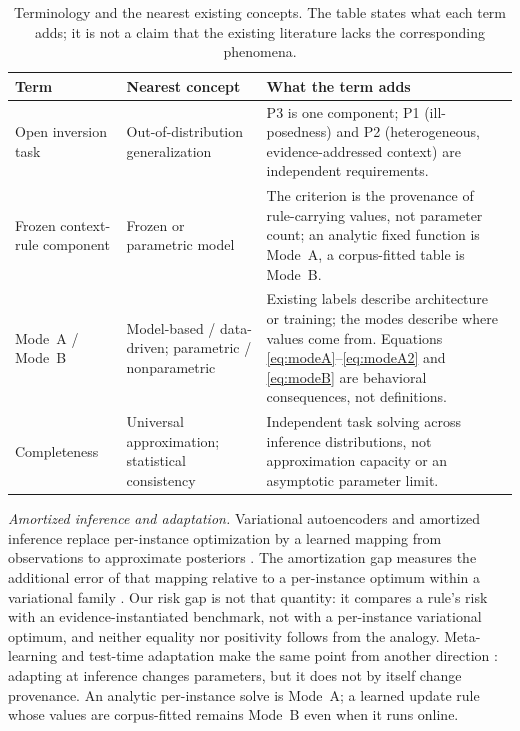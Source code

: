 \documentclass[twoside,11pt]{article}
\begin{document}
\begin{table}[!ht]
\caption{Terminology and the nearest existing concepts. The table states what each term adds; it is not a claim that the existing literature lacks the corresponding phenomena.}
\label{tab:terminology}
\centering
\small
\begin{tabular}{@{}>{\raggedright\arraybackslash}p{}>{\raggedright\arraybackslash}p{}>{\raggedright\arraybackslash}p{}@{}}
\hline
\textbf{Term} & \textbf{Nearest concept} & \textbf{What the term adds}\\
\hline
Open inversion task & Out-of-distribution generalization & P3 is one component; P1 (ill-posedness) and P2 (heterogeneous, evidence-addressed context) are independent requirements.\\
Frozen context-rule component & Frozen or parametric model & The criterion is the provenance of rule-carrying values, not parameter count; an analytic fixed function is Mode~A, a corpus-fitted table is Mode~B.\\
Mode~A / Mode~B & Model-based / data-driven; parametric / nonparametric & Existing labels describe architecture or training; the modes describe where values come from. Equations \eqref{eq:modeA}--\eqref{eq:modeA2} and \eqref{eq:modeB} are behavioral consequences, not definitions.\\
Completeness & Universal approximation; statistical consistency & Independent task solving across inference distributions, not approximation capacity or an asymptotic parameter limit.\\
\hline
\end{tabular}
\end{table}

\emph{Amortized inference and adaptation.}
Variational autoencoders and amortized inference replace per-instance optimization by a learned mapping from observations to approximate posteriors \citep{kingma2014,rezende2014}. The amortization gap measures the additional error of that mapping relative to a per-instance optimum within a variational family \citep{cremer2018}. Our risk gap is not that quantity: it compares a rule's risk with an evidence-instantiated benchmark, not with a per-instance variational optimum, and neither equality nor positivity follows from the analogy. Meta-learning and test-time adaptation make the same point from another direction \citep{finn2017,hospedales2021,sun2020,liang2024}: adapting at inference changes parameters, but it does not by itself change provenance. An analytic per-instance solve is Mode~A; a learned update rule whose values are corpus-fitted remains Mode~B even when it runs online.
\end{document}
